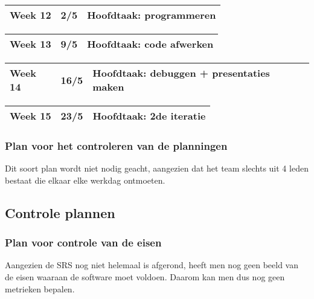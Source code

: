 \documentclass{article}
\begin{document}
\begin{center}
\begin{tabular}[t]{|p{1.3cm}|p{0.8cm}|p{9cm}|}
\hline
Week 12 & 2/5  &	\textbf{Hoofdtaak:} programmeren\\
\hline
\end{tabular}

\begin{tabular}[t]{|p{1.3cm}|p{0.8cm}|p{9cm}|}
\hline
Week 13 &	9/5 &	\textbf{Hoofdtaak:} code afwerken \\
\hline
\end{tabular}

\begin{tabular}[t]{|p{1.3cm}|p{0.8cm}|p{9cm}|}
\hline
Week 14 &	16/5 &	\textbf{Hoofdtaak:} debuggen + presentaties maken \\
\hline
\end{tabular}

\begin{tabular}[t]{|p{1.3cm}|p{0.8cm}|p{9cm}|}
\hline
Week 15 &	23/5 &	\textbf{Hoofdtaak:} 2de iteratie  \\
\hline
\end{tabular}

\end{center}

\subsubsection{Plan voor het controleren van de planningen}

Dit soort plan wordt niet nodig geacht, aangezien dat het team slechts uit 4 leden bestaat die elkaar elke werkdag ontmoeten.


\subsection{Controle plannen}


\subsubsection{Plan voor controle van de eisen}

Aangezien de SRS nog niet helemaal is afgerond, heeft men nog geen beeld van de eisen waaraan de software moet voldoen. Daarom kan men dus nog geen metrieken bepalen.
\end{document}
